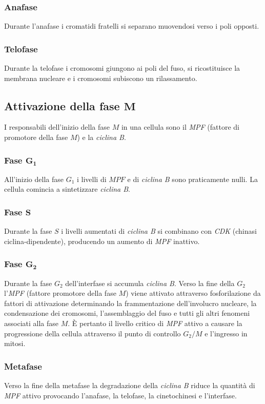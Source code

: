 \subsubsection{Anafase}
Durante l'anafase i cromatidi fratelli si separano muovendosi verso i poli opposti.
\subsubsection{Telofase}
Durante la telofase i cromosomi giungono ai poli del fuso, si ricostituisce la membrana nucleare e i cromosomi subiscono un rilassamento. 
\subsection{Attivazione della fase $\mathbf{M}$}
I responsabili dell'inizio della fase $M$ in una cellula sono il \emph{MPF} (fattore di promotore della fase $M$) e la \emph{ciclina B}. 
\subsubsection{Fase $\mathbf{G_1}$}
All'inizio della fase $G_1$ i livelli di $MPF$ e di \emph{ciclina B} sono praticamente nulli. La cellula comincia a sintetizzare \emph{ciclina B}.
\subsubsection{Fase $\mathbf{S}$}
Durante la fase $S$ i livelli aumentati di \emph{ciclina B} si combinano con \emph{CDK} (chinasi ciclina-dipendente), producendo un aumento di \emph{MPF} inattivo. 
\subsubsection{Fase $\mathbf{G_2}$}
Durante la fase $G_2$ dell'interfase si accumula \emph{ciclina B}. Verso la fine della $G_2$ l'\emph{MPF} (fattore promotore della fase $M$) viene attivato attraverso fosforilazione 
da fattori di attivazione determinando la frammentazione dell'involucro nucleare, la condensazione dei cromosomi, l'assemblaggio del fuso e tutti gli altri fenomeni associati alla fase
$M$. \`E pertanto il livello critico di \emph{MPF} attivo a causare la progressione della cellula attraverso il punto di controllo $G_2/M$ e l'ingresso in mitosi. 
\subsubsection{Metafase}
Verso la fine della metafase la degradazione della \emph{ciclina B} riduce la quantit\`a di \emph{MPF} attivo provocando l'anafase, la telofase, la cinetochinesi e l'interfase. 

